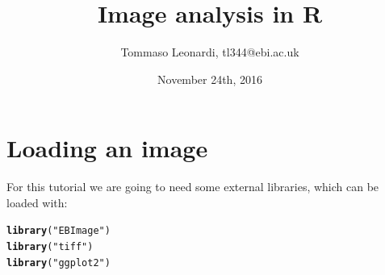 \documentclass{article}\usepackage[]{graphicx}\usepackage[]{color}
\makeatletter
\newcommand{\hlstr}[1]{\textcolor[rgb]{0.192,0.494,0.8}{#1}}%
\newcommand{\hlstd}[1]{\textcolor[rgb]{0.345,0.345,0.345}{#1}}%
\newcommand{\hlkwd}[1]{\textcolor[rgb]{0.737,0.353,0.396}{\textbf{#1}}}%
\newenvironment{kframe}{%
 \def\at@end@of@kframe{}%
 \ifinner\ifhmode%
  \def\at@end@of@kframe{\end{minipage}}%
  \begin{minipage}{\columnwidth}%
 \fi\fi%
 \def\FrameCommand##1{\hskip\@totalleftmargin \hskip-\fboxsep
 \colorbox{shadecolor}{##1}\hskip-\fboxsep
     \hskip-\linewidth \hskip-\@totalleftmargin \hskip\columnwidth}%
 \MakeFramed {\advance\hsize-\width
   \@totalleftmargin\z@ \linewidth\hsize
   \@setminipage}}%
 {\par\unskip\endMakeFramed%
 \at@end@of@kframe}
\newenvironment{knitrout}{}{} %
\makeatother
\begin{document}
\title{Image analysis in R}
\author{Tommaso Leonardi, tl344@ebi.ac.uk}
\date{November 24th, 2016}
\maketitle
\tableofcontents
\section{Loading an image}
For this tutorial we are going to need some external libraries, which can be loaded with:
\begin{knitrout}
\color{fgcolor}\begin{kframe}
\begin{alltt}
\hlkwd{library}\hlstd{(}\hlstr{"EBImage"}\hlstd{)}
\hlkwd{library}\hlstd{(}\hlstr{"tiff"}\hlstd{)}
\hlkwd{library}\hlstd{(}\hlstr{"ggplot2"}\hlstd{)}
\end{alltt}
\end{kframe}
\end{knitrout}
\end{document}
